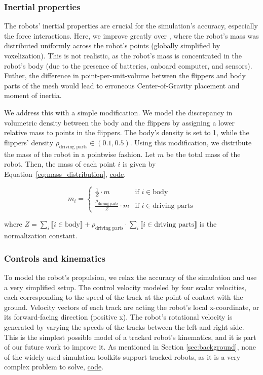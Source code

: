 \documentclass[a4paper,12pt]{article}
\begin{document}
\clearpage

\subsubsection{Inertial properties} 
The robots' inertial properties are crucial for the simulation's accuracy, especially the force interactions. Here, we improve greatly over \citet{Agishev_2024}, where the robot's mass was distributed uniformly across the robot's points (globally simplified by voxelization). This is not realistic, as the robot's mass is concentrated in the robot's body (due to the presence of batteries, onboard computer, and sensors). Futher, the difference in point-per-unit-volume between the flippers and body parts of the mesh would lead to erroneous Center-of-Gravity placement and moment of inertia.

We address this with a simple modification. We model the discrepancy in volumetric density between the body and the flippers by assigning a lower relative mass to points in the flippers. The body's density is set to 1, while the flippers' density $\rho_\text{driving parts} \in \left(0.1,0.5\right)$. Using this modification, we distribute the mass of the robot in a pointwise fashion. Let $m$ be the total mass of the robot. Then, the mass of each point $i$ is given by Equation~\ref{eq:mass_distribution}, \href{https://github.com/edavidk7/tracked_sim_rl/blob/main/configs/robot_config.py\#L173}{code}.

\begin{equation}
  \label{eq:mass_distribution}
  m_i = \begin{cases}
    \frac{1}{Z} \cdot m & \text{if } i \in \text{body} \\
    \frac{\rho_\text{driving parts}}{Z} \cdot m & \text{if } i \in \text{driving parts}
  \end{cases} 
\end{equation}

where $Z = \sum_{i} \llbracket {i \in \text{body}} \rrbracket + \rho_\text{driving parts} \cdot \sum_{i} \llbracket {i \in \text{driving parts}} \rrbracket$ is the normalization constant. 

\subsubsection{Controls and kinematics}

To model the robot's propulsion, we relax the accuracy of the simulation and use a very simplified setup. The control velocity modeled by four scalar velocities, each corresponding to the speed of the track at the point of contact with the ground. Velocity vectors of each track are acting the robot's local x-coordinate, or its forward-facing direction (positive x). The robot's rotational velocity is generated by varying the speeds of the tracks between the left and right side. This is the simplest possible model of a tracked robot's kinematics, and it is part of our future work to improve it. As mentioned in Section \ref{sec:background}, none of the widely used simulation toolkits support tracked robots, as it is a very complex problem to solve, \href{https://github.com/edavidk7/tracked_sim_rl/blob/main/engine/engine.py#L147}{code}.
\end{document}
